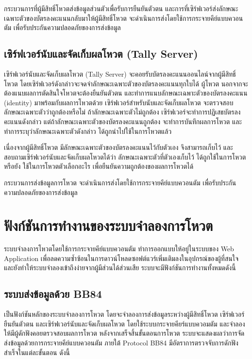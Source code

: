 กระบวนการที่ผู้มีสิทธิ์โหวตส่งข้อมูลส่วนตัวเพื่อรับการยืนยันตัวตน และการที่เซิร์ฟเวอร์ส่งลักษณะเฉพาะตัวของบัตรลงคะแนนกลับมาให้ผู้มีสิทธิ์โหวต 
จะดำเนินการส่งโดยใช้การกระจายคีย์แบบควอนตัม เพื่อรับประกันความปลอดภัยของการส่งข้อมูล

\subsection{เซิร์ฟเวอร์นับและจัดเก็บผลโหวต (Tally Server)}
เซิร์ฟเวอร์นับและจัดเก็บผลโหวต (Tally Server) จะคอยรับบัตรลงคะแนนออนไลน์จากผู้มีสิทธิ์โหวต โดยเซิร์ฟเวอร์ดังกล่าวจะจดจำลักษณะเฉพาะตัวของบัตรลงคะแนนทุกใบได้
ผู้โหวต นอกจากจะต้องแนบผลการตัดสินใจโหวตจะต้องยืนยันตัวตน และทำการแนบลักษณะเฉพาะตัวของบัตรลงคะแนน (identity) มาพร้อมกับผลการโหวตด้วย 
เซิร์ฟเวอร์สำหรับนับและจัดเก็บผลโหวต จะตรวจสอบลักษณะเฉพาะตัวว่าถูกต้องหรือไม่ ถ้าลักษณะเฉพาะตัวไม่ถูกต้อง เซิร์ฟเวอร์จะทำการปฏิเสธบัตรลงคะแนนดังกล่าว
แต่ถ้าลักษณะเฉพาะตัวของบัตรลงคะแนนถูกต้อง จะทำการบันทึกผลการโหวต และทำการระบุว่าลักษณะเฉพาะตัวดังกล่าว ได้ถูกนำไปใช้ในการโหวตแล้ว

เนื่องจากผู้มีสิทธิ์โหวต มีลักษณะเฉพาะตัวของบัตรลงคะแนนไว้กับตัวเอง จึงสามารถเก็บไว้ และสอบถามเซิร์ฟเวอร์นับและจัดเก็บผลโหวตได้ว่า ลักษณะเฉพาะตัวที่ตัวเองเก็บไว้
ได้ถูกใช้ในการโหวตหรือยัง ใช้ในการโหวตตัวเลือกอะไร เพื่อยืนยันความถูกต้องของผลการโหวตได้

กระบวนการส่งข้อมูลการโหวต จะดำเนินการส่งโดยใช้การกระจายคีย์แบบควอนตัม เพื่อรับประกันความปลอดภัยของการส่งข้อมูล


\section{ฟังก์ชันการทำงานของระบบจำลองการโหวต}

ระบบจำลงการโหวตโดยใช้การกระจายคีย์แบบควอนตัม 
ทำการออกแบบให้อยู่ในระบบของ Web Application เพื่อลดความซ้ำซ้อนในการดาวน์โหลดซอฟต์แวร์เพิ่มเติมลงในอุปกรณ์ของผู้ที่สนใจ
และยังทำให้ระบบจำลองเข้าถึงง่ายจากผู้มีส่วนได้ส่วนเสีย ระบบจะมีฟังก์ชันการทำงานทั้งหมดดังนี้



\subsection{ระบบส่งข้อมูลด้วย BB84}
  เป็นฟังก์ชันหลักของระบบจำลองการโหวต โดยจะจำลองการส่งข้อมูลระหว่างผู้มีสิทธิ์โหวต เซิร์ฟเวอร์ยืนยันตัวตน และเซิร์ฟเวอร์นับและจัดเก็บผลโหวต 
โดยใช้ระบบกระจายคียร์แบบควอมตัม และจำลองให้มีผู้ดักฟังคอยตรวจสอบผลการโหวต หลังจากเสร็จสิ้นขั้นตอนการโหวต ระบบจะแสดงผลว่าการจัดส่งข้อมูลด้วยการกระจายคีย์แบบควอนตัม ภายใต้ Protocol BB84 
มีอัตราการตรวจจับการดักฟังสำเร็จในแต่ละขั้นตอน ดังนี้

